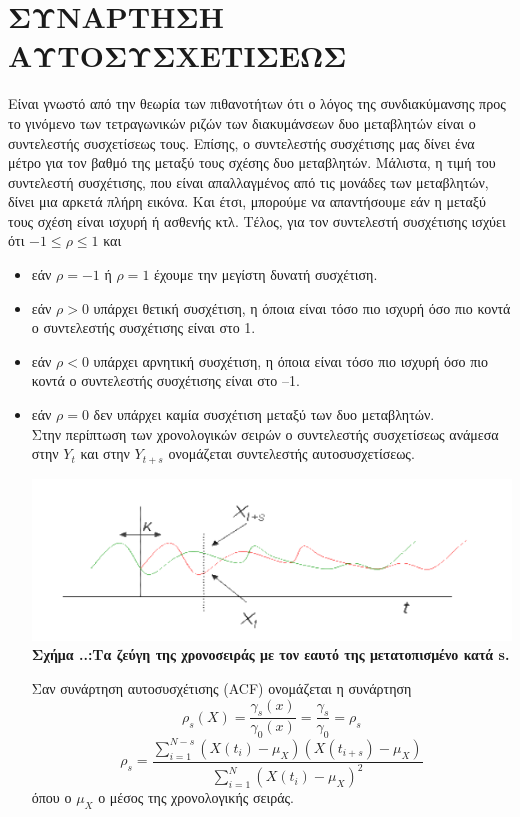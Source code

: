 \section{ΣΥΝΑΡΤΗΣΗ ΑΥΤΟΣΥΣΧΕΤΙΣΕΩΣ}

Είναι γνωστό από την θεωρία των πιθανοτήτων ότι ο λόγος της
συνδιακύμανσης προς το γινόμενο των τετραγωνικών ριζών των διακυμάνσεων δυο
μεταβλητών είναι ο συντελεστής συσχετίσεως τους. Επίσης, ο συντελεστής
συσχέτισης μας δίνει ένα μέτρο για τον βαθμό της μεταξύ τους σχέσης δυο
μεταβλητών. Μάλιστα, η τιμή του συντελεστή συσχέτισης, που είναι απαλλαγμένος
από τις μονάδες των μεταβλητών, δίνει μια αρκετά πλήρη εικόνα. Και έτσι, μπορούμε
να απαντήσουμε εάν η μεταξύ τους σχέση είναι ισχυρή ή ασθενής κτλ. Τέλος, για τον
συντελεστή συσχέτισης ισχύει ότι $-1\leq \rho\leq 1$ και\\
\begin{itemize}
\item εάν $ \rho=-1$ ή $ \rho=1$ έχουμε την μεγίστη δυνατή συσχέτιση.
\item εάν $\rho> 0$ υπάρχει θετική συσχέτιση, η όποια είναι τόσο πιο ισχυρή όσο πιο κοντά ο
συντελεστής συσχέτισης είναι στο 1.
\item εάν $\rho< 0$ υπάρχει αρνητική συσχέτιση, η όποια είναι τόσο πιο ισχυρή όσο πιο κοντά
ο συντελεστής συσχέτισης είναι στο –1.
\item εάν $\rho=0$ δεν υπάρχει καμία συσχέτιση μεταξύ των δυο μεταβλητών.\\

Στην περίπτωση των χρονολογικών σειρών ο συντελεστής συσχετίσεως
ανάμεσα στην $ Y_t$ και στην $ Y_{t+s}$
ονομάζεται συντελεστής αυτοσυσχετίσεως.\\
\begin{center}
\includegraphics[scale=0.6]{graf17.png}\\
\textbf{Σχήμα ..:Τα ζεύγη της χρονοσειράς με τον εαυτό της μετατοπισμένο κατά s.}
\end{center}
Σαν συνάρτηση αυτοσυσχέτισης (ACF) ονομάζεται η συνάρτηση\\
$$ \rho_s\left(X\right)=\frac{\gamma_s\left(x\right)}{\gamma_0\left(x\right)}=\frac{\gamma_s}{\gamma_0}=\rho_s $$
$$ \rho_s=\frac{\sum_{i=1}^{N-s} \left(X\left(t_i\right)-\mu_X\right)\left(X\left(t_{i+s}\right)-\mu_X\right)}{\sum_{i=1}^{N} \left(X\left(t_i\right)
-\mu_X\right)^2} $$
όπου ο $ \mu_X$
ο μέσος της χρονολογικής σειράς.
\end{itemize}









\endinput
